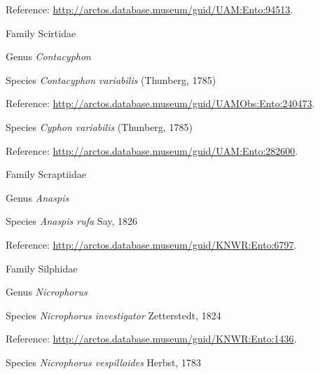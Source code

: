 \documentclass[9pt, article]{memoir}
\begin{document}
\begin{multicols}{2}
Reference: 
\url{http://arctos.database.museum/guid/UAM:Ento:94513}.

\vspace{6pt}\noindent\hspace{24pt}Family Scirtidae


\vspace{6pt}\noindent\hspace{30pt}Genus \textit{Contacyphon}


\vspace{6pt}\noindent\hspace{36pt}Species \textit{Contacyphon variabilis} (Thunberg, 1785)


Reference: 
\url{http://arctos.database.museum/guid/UAMObs:Ento:240473}.

\vspace{6pt}\noindent\hspace{36pt}Species \textit{Cyphon variabilis} (Thunberg, 1785)


Reference: 
\url{http://arctos.database.museum/guid/UAM:Ento:282600}.

\vspace{6pt}\noindent\hspace{24pt}Family Scraptiidae


\vspace{6pt}\noindent\hspace{30pt}Genus \textit{Anaspis}


\vspace{6pt}\noindent\hspace{36pt}Species \textit{Anaspis rufa} Say, 1826


Reference: 
\url{http://arctos.database.museum/guid/KNWR:Ento:6797}.

\vspace{6pt}\noindent\hspace{24pt}Family Silphidae


\vspace{6pt}\noindent\hspace{30pt}Genus \textit{Nicrophorus}


\vspace{6pt}\noindent\hspace{36pt}Species \textit{Nicrophorus investigator} Zetterstedt, 1824


Reference: 
\url{http://arctos.database.museum/guid/KNWR:Ento:1436}.

\vspace{6pt}\noindent\hspace{36pt}Species \textit{Nicrophorus vespilloides} Herbst, 1783



\end{multicols}
\end{document}

